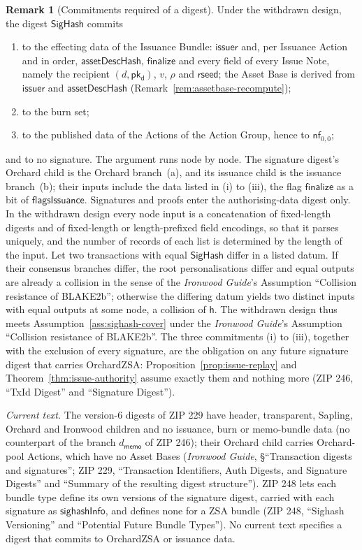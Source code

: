\documentclass[11pt,a4paper]{article}
\theoremstyle{definition}
\newtheorem{remark}[theorem]{Remark}
\newcommand{\nfsym}{\mathsf{nf}}
\newcommand{\pkd}{\ensuremath{\mathsf{pk_d}}}
\begin{document}
\begin{remark}[Commitments required of a digest]\label{rem:digest-commitments}
Under the withdrawn design, the digest $\mathsf{SigHash}$ commits
\begin{enumerate}[label=(\roman*)]
\item to the effecting data of the Issuance Bundle: $\mathsf{issuer}$ and,
  per Issuance Action and in order, $\mathsf{assetDescHash}$,
  $\mathsf{finalize}$ and every field of every Issue Note, namely the
  recipient $(d, \pkd)$, $v$, $\rho$ and $\mathsf{rseed}$; the Asset Base
  is derived from $\mathsf{issuer}$ and $\mathsf{assetDescHash}$
  (Remark~\ref{rem:assetbase-recompute});
\item to the burn set;
\item to the published data of the Actions of the Action Group, hence to
  $\nfsym_{0,0}$;
\end{enumerate}
and to no signature. The argument runs node by node. The signature
digest's Orchard child is the Orchard branch~(a), and its issuance child
is the issuance branch~(b); their inputs include the data listed in (i)
to (iii), the flag $\mathsf{finalize}$ as a bit of
$\mathsf{flagsIssuance}$. Signatures and proofs enter the authorising-data
digest only. In the withdrawn design every node input is a concatenation
of fixed-length digests and of fixed-length or length-prefixed field
encodings, so that it parses uniquely, and the number of records of each
list is determined by the length of the input. Let two transactions
with equal $\mathsf{SigHash}$ differ in a listed datum. If their consensus
branches differ, the root personalisations differ and equal outputs are
already a collision in the sense of the \emph{Ironwood Guide}'s Assumption
``Collision resistance of BLAKE2b''; otherwise the differing datum yields
two distinct inputs with equal outputs at some node, a collision of
$\mathsf{h}$. The withdrawn design thus meets
Assumption~\ref{ass:sighash-cover} under the \emph{Ironwood Guide}'s
Assumption ``Collision resistance of BLAKE2b''. The three commitments
(i) to (iii), together with the exclusion of every signature, are the
obligation on any future signature digest that carries OrchardZSA:
Proposition~\ref{prop:issue-replay} and Theorem~\ref{thm:issue-authority}
assume exactly them and nothing more (ZIP 246, ``TxId Digest'' and
``Signature Digest'').
\end{remark}

\emph{Current text.} The version-$6$ digests of ZIP 229 have header,
transparent, Sapling, Orchard and Ironwood children and no issuance, burn
or memo-bundle data (no counterpart of the branch $d_{\mathsf{memo}}$ of
ZIP 246); their Orchard child carries Orchard-pool Actions, which have
no Asset Bases (\emph{Ironwood Guide}, \S``Transaction digests and
signatures''; ZIP 229, ``Transaction Identifiers, Auth Digests, and
Signature Digests'' and ``Summary of the resulting digest structure'').
ZIP 248 lets each bundle type define its own versions of the signature
digest, carried with each signature as $\mathsf{sighashInfo}$, and defines
none for a ZSA bundle (ZIP 248, ``Sighash Versioning'' and ``Potential
Future Bundle Types''). No current text specifies a digest that commits to
OrchardZSA or issuance data.
\end{document}
